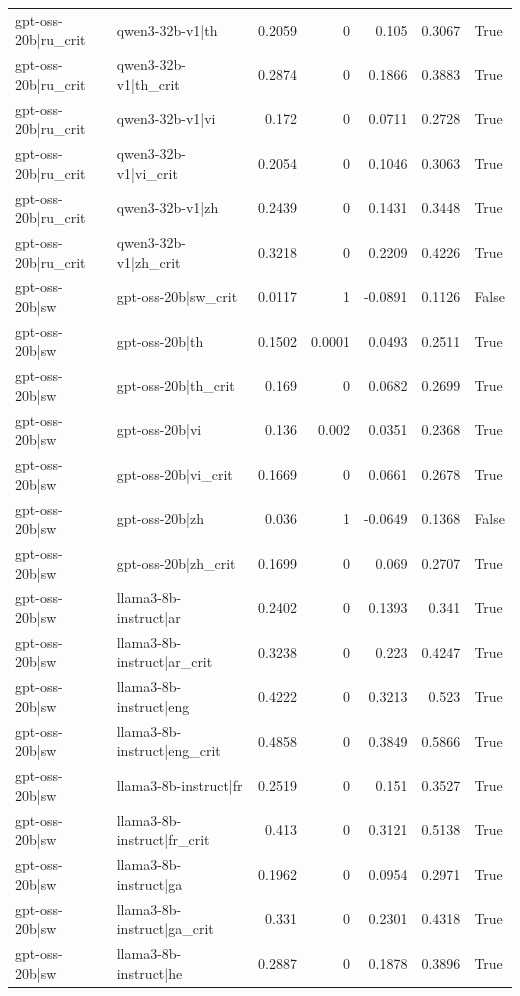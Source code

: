 \begin{table}
\begin{tabular}{l l r r r r l}
gpt-oss-20b|ru_crit & qwen3-32b-v1|th & 0.2059 & 0 & 0.105 & 0.3067 & True \\
gpt-oss-20b|ru_crit & qwen3-32b-v1|th_crit & 0.2874 & 0 & 0.1866 & 0.3883 & True \\
gpt-oss-20b|ru_crit & qwen3-32b-v1|vi & 0.172 & 0 & 0.0711 & 0.2728 & True \\
gpt-oss-20b|ru_crit & qwen3-32b-v1|vi_crit & 0.2054 & 0 & 0.1046 & 0.3063 & True \\
gpt-oss-20b|ru_crit & qwen3-32b-v1|zh & 0.2439 & 0 & 0.1431 & 0.3448 & True \\
gpt-oss-20b|ru_crit & qwen3-32b-v1|zh_crit & 0.3218 & 0 & 0.2209 & 0.4226 & True \\
gpt-oss-20b|sw & gpt-oss-20b|sw_crit & 0.0117 & 1 & -0.0891 & 0.1126 & False \\
gpt-oss-20b|sw & gpt-oss-20b|th & 0.1502 & 0.0001 & 0.0493 & 0.2511 & True \\
gpt-oss-20b|sw & gpt-oss-20b|th_crit & 0.169 & 0 & 0.0682 & 0.2699 & True \\
gpt-oss-20b|sw & gpt-oss-20b|vi & 0.136 & 0.002 & 0.0351 & 0.2368 & True \\
gpt-oss-20b|sw & gpt-oss-20b|vi_crit & 0.1669 & 0 & 0.0661 & 0.2678 & True \\
gpt-oss-20b|sw & gpt-oss-20b|zh & 0.036 & 1 & -0.0649 & 0.1368 & False \\
gpt-oss-20b|sw & gpt-oss-20b|zh_crit & 0.1699 & 0 & 0.069 & 0.2707 & True \\
gpt-oss-20b|sw & llama3-8b-instruct|ar & 0.2402 & 0 & 0.1393 & 0.341 & True \\
gpt-oss-20b|sw & llama3-8b-instruct|ar_crit & 0.3238 & 0 & 0.223 & 0.4247 & True \\
gpt-oss-20b|sw & llama3-8b-instruct|eng & 0.4222 & 0 & 0.3213 & 0.523 & True \\
gpt-oss-20b|sw & llama3-8b-instruct|eng_crit & 0.4858 & 0 & 0.3849 & 0.5866 & True \\
gpt-oss-20b|sw & llama3-8b-instruct|fr & 0.2519 & 0 & 0.151 & 0.3527 & True \\
gpt-oss-20b|sw & llama3-8b-instruct|fr_crit & 0.413 & 0 & 0.3121 & 0.5138 & True \\
gpt-oss-20b|sw & llama3-8b-instruct|ga & 0.1962 & 0 & 0.0954 & 0.2971 & True \\
gpt-oss-20b|sw & llama3-8b-instruct|ga_crit & 0.331 & 0 & 0.2301 & 0.4318 & True \\
gpt-oss-20b|sw & llama3-8b-instruct|he & 0.2887 & 0 & 0.1878 & 0.3896 & True \\

\end{tabular}
\end{table}
